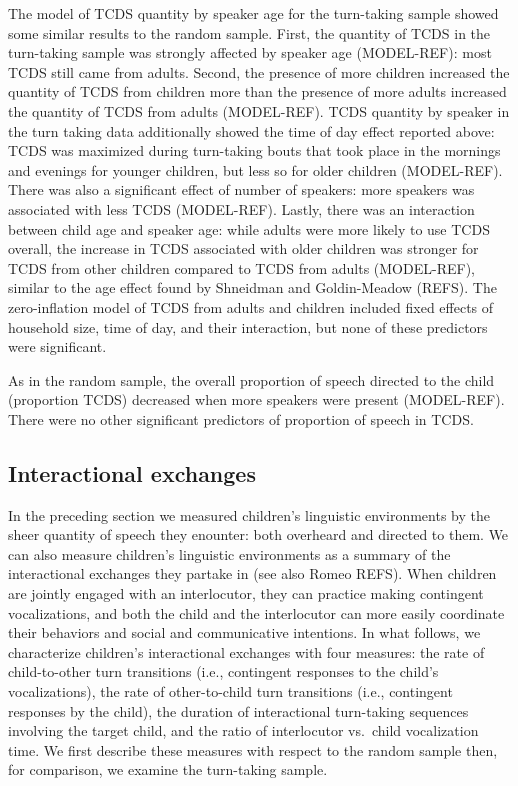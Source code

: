 \documentclass[floatsintext,man]{apa6}
\theoremstyle{definition}
\theoremstyle{definition}
\theoremstyle{definition}
\theoremstyle{remark}
\begin{document}
The model of TCDS quantity by speaker age for the turn-taking sample
showed some similar results to the random sample. First, the quantity of
TCDS in the turn-taking sample was strongly affected by speaker age
(MODEL-REF): most TCDS still came from adults. Second, the presence of
more children increased the quantity of TCDS from children more than the
presence of more adults increased the quantity of TCDS from adults
(MODEL-REF). TCDS quantity by speaker in the turn taking data
additionally showed the time of day effect reported above: TCDS was
maximized during turn-taking bouts that took place in the mornings and
evenings for younger children, but less so for older children
(MODEL-REF). There was also a significant effect of number of speakers:
more speakers was associated with less TCDS (MODEL-REF). Lastly, there
was an interaction between child age and speaker age: while adults were
more likely to use TCDS overall, the increase in TCDS associated with
older children was stronger for TCDS from other children compared to
TCDS from adults (MODEL-REF), similar to the age effect found by
Shneidman and Goldin-Meadow (REFS). The zero-inflation model of TCDS
from adults and children included fixed effects of household size, time
of day, and their interaction, but none of these predictors were
significant.

As in the random sample, the overall proportion of speech directed to
the child (proportion TCDS) decreased when more speakers were present
(MODEL-REF). There were no other significant predictors of proportion of
speech in TCDS.

\subsection{Interactional exchanges}\label{interactional-exchanges}

In the preceding section we measured children's linguistic environments
by the sheer quantity of speech they enounter: both overheard and
directed to them. We can also measure children's linguistic environments
as a summary of the interactional exchanges they partake in (see also
Romeo REFS). When children are jointly engaged with an interlocutor,
they can practice making contingent vocalizations, and both the child
and the interlocutor can more easily coordinate their behaviors and
social and communicative intentions. In what follows, we characterize
children's interactional exchanges with four measures: the rate of
child-to-other turn transitions (i.e., contingent responses to the
child's vocalizations), the rate of other-to-child turn transitions
(i.e., contingent responses by the child), the duration of interactional
turn-taking sequences involving the target child, and the ratio of
interlocutor vs.~child vocalization time. We first describe these
measures with respect to the random sample then, for comparison, we
examine the turn-taking sample.
\end{document}

